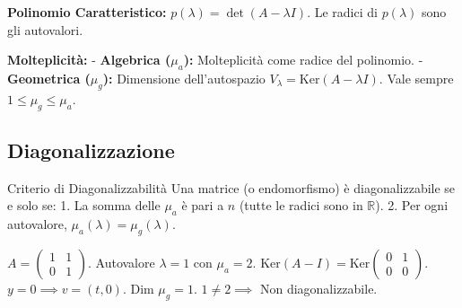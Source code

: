 \begin{definitionbox}
\textbf{Polinomio Caratteristico:} $p(\lambda) = \det(A - \lambda I)$.
Le radici di $p(\lambda)$ sono gli autovalori.
\end{definitionbox}

\begin{definitionbox}
\textbf{Molteplicità:}
- \textbf{Algebrica ($\mu_a$):} Molteplicità come radice del polinomio.
- \textbf{Geometrica ($\mu_g$):} Dimensione dell'autospazio $V_\lambda = \text{Ker}(A - \lambda I)$.
Vale sempre $1 \le \mu_g \le \mu_a$.
\end{definitionbox}

\subsection{Diagonalizzazione}
\begin{concept}{Criterio di Diagonalizzabilità}
Una matrice (o endomorfismo) è diagonalizzabile se e solo se:
1. La somma delle $\mu_a$ è pari a $n$ (tutte le radici sono in $\mathbb{R}$).
2. Per ogni autovalore, $\mu_a(\lambda) = \mu_g(\lambda)$.
\end{concept}

\begin{exercisebox}[title={Esempio Non Diagonalizzabile}]
$A = \begin{pmatrix} 1 & 1 \\ 0 & 1 \end{pmatrix}$.
Autovalore $\lambda=1$ con $\mu_a=2$.
$\text{Ker}(A-I) = \text{Ker} \begin{pmatrix} 0 & 1 \\ 0 & 0 \end{pmatrix}$.
$y=0 \implies v=(t,0)$. Dim $\mu_g=1$.
$1 \neq 2 \implies$ Non diagonalizzabile.
\end{exercisebox}
